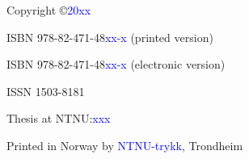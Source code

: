 Copyright \copyright \textcolor{blue}{20xx \thesisAuthor}

\vspace{0.5cm}

ISBN  978-82-471-48\textcolor{blue}{xx-x} (printed version)

ISBN  978-82-471-48\textcolor{blue}{xx-x} (electronic version)

ISSN 1503-8181

Thesis at NTNU:\textcolor{blue}{xxx}

\vspace{0.5cm}

Printed in Norway by \textcolor{blue}{NTNU-trykk}, Trondheim

\cleardoublepage